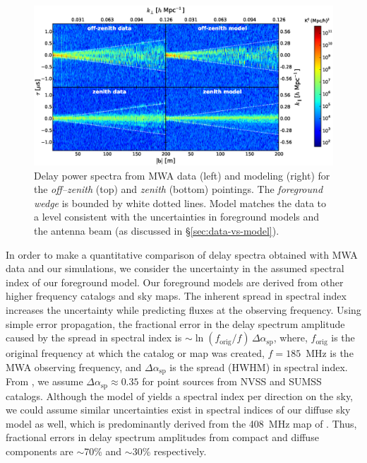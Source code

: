 \documentclass[preprint2,iop,numberedappendix,twocolappendix,appendixfloats]{emulateapj}
\begin{document}
\begin{figure}[htb]
\centering
\includegraphics[width=\linewidth]{figure6.eps}
\caption{Delay power spectra from MWA data (left) and modeling (right) for the {\it off--zenith} (top) and {\it zenith} (bottom) pointings. The {\it foreground wedge} is bounded by white dotted lines. Model matches the data to a level consistent with the uncertainties in foreground models and the antenna beam (as discussed in \S\ref{sec:data-vs-model}). \label{fig:fhd-sim-comparison}}
\end{figure}

In order to make a quantitative comparison of delay spectra obtained with MWA data and our simulations, we consider the uncertainty in the assumed spectral index of our foreground model. Our foreground models are derived from other higher frequency catalogs and sky maps. The inherent spread in spectral index increases the uncertainty while predicting fluxes at the observing frequency. Using simple error propagation, the fractional error in the delay spectrum amplitude caused by the spread in spectral index is $\sim \ln(f_\textrm{orig}/f)\,\Delta\alpha_\textrm{sp}$, where, $f_\textrm{orig}$ is the original frequency at which the catalog or map was created, $f=185$~MHz is the MWA observing frequency, and $\Delta\alpha_\textrm{sp}$ is the spread (HWHM) in spectral index. From \citet{mau03}, we assume $\Delta\alpha_\textrm{sp} \approx 0.35$ for point sources from NVSS and SUMSS catalogs. Although the model of \citet{deo08} yields a spectral index per direction on the sky, we could assume similar uncertainties exist in spectral indices of our diffuse sky model as well, which is predominantly derived from the 408~MHz map of \citet{has82}. Thus, fractional errors in delay spectrum amplitudes from compact and diffuse components are $\sim$70\% and $\sim$30\% respectively. 
\end{document}
